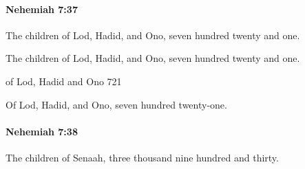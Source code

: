		\paragraph{Nehemiah 7:37} %
			\label{NEHEMIAH-7-37}

			The children of Lod, Hadid, and Ono, seven hundred twenty and one.

			\begin{versebox}
					\item[BHS] 
					\item[LXX] 
					\item[ASV] The children of Lod, Hadid, and Ono, seven hundred twenty and one.
					\item[NIV] of Lod, Hadid and Ono 721
					\item[NRSV] Of Lod, Hadid, and Ono, seven hundred twenty-one.
			\end{versebox}

		\paragraph{Nehemiah 7:38} %
			\label{NEHEMIAH-7-38}

			The children of Senaah, three thousand nine hundred and thirty.

